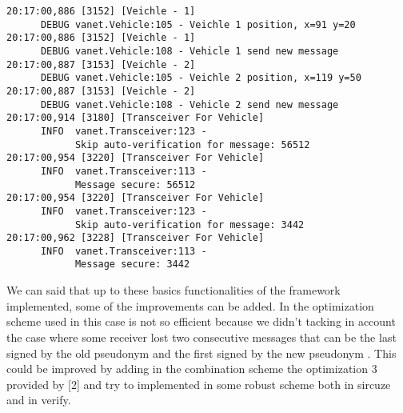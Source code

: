 \hybrid
\begin{verbatim}
20:17:00,886 [3152] [Veichle - 1] 
      DEBUG vanet.Vehicle:105 - Veichle 1 position, x=91 y=20
20:17:00,886 [3152] [Veichle - 1] 
      DEBUG vanet.Vehicle:108 - Vehicle 1 send new message
20:17:00,887 [3153] [Veichle - 2] 
      DEBUG vanet.Vehicle:105 - Veichle 2 position, x=119 y=50
20:17:00,887 [3153] [Veichle - 2] 
      DEBUG vanet.Vehicle:108 - Vehicle 2 send new message
20:17:00,914 [3180] [Transceiver For Vehicle] 
      INFO  vanet.Transceiver:123 - 
            Skip auto-verification for message: 56512
20:17:00,954 [3220] [Transceiver For Vehicle] 
      INFO  vanet.Transceiver:113 - 
            Message secure: 56512
20:17:00,954 [3220] [Transceiver For Vehicle] 
      INFO  vanet.Transceiver:123 - 
            Skip auto-verification for message: 3442
20:17:00,962 [3228] [Transceiver For Vehicle] 
      INFO  vanet.Transceiver:113 - 
            Message secure: 3442
\end{verbatim}
We can said that up to these basics functionalities of the framework implemented, some of the improvements can be added.  In the optimization scheme used in this case is not so efficient because we didn't tacking in account the case where some receiver lost two consecutive messages that can be the last signed by the old pseudonym and the first signed by the  new pseudonym . This could be improved by adding in the combination scheme the optimization 3 provided by [2] and try to implemented in some robust scheme both in sircuze and in verify.\\
